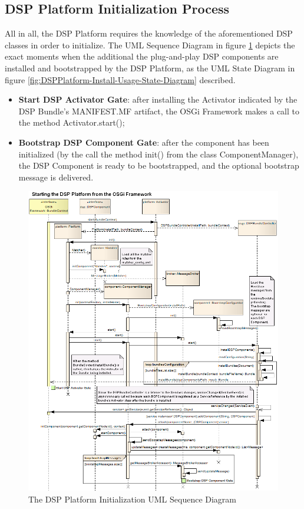 \subsection{DSP Platform Initialization Process}

All in all, the DSP Platform requires the knowledge of the aforementioned DSP
classes in order to initialize. The UML Sequence Diagram \cite{uml} in figure
\ref{fig:From-OSGi-DSP-Platform-Start-to-All-Components-Sequence-Diagram}
depicts the exact moments when the additional the plug-and-play DSP components
are installed and bootstrapped by the DSP Platform, as the UML State Diagram
\cite{uml} in figure \ref{fig:DSPPlatform-Install-Usage-State-Diagram}
described.

\begin{itemize}
  \item \textbf{Start DSP Activator Gate}: after installing the Activator
  indicated by the DSP Bundle's MANIFEST.MF artifact, the OSGi Framework makes
  a call to the method Activator.start();
  \item \textbf{Bootstrap DSP Component Gate}: after the component has been
  initialized (by the call the method init() from the class ComponentManager),
  the DSP Component is ready to be bootstrapped, and the optional bootstrap
  message is delivered.
\end{itemize}

\begin{figure}[!b]
  \centering
  \includegraphics[scale=0.5]{../diagrams/From-OSGi-DSP-Platform-Start-to-All-Components-Sequence-Diagram}
  \caption{The DSP Platform Initialization UML Sequence Diagram}
  \label{fig:From-OSGi-DSP-Platform-Start-to-All-Components-Sequence-Diagram}
\end{figure}

